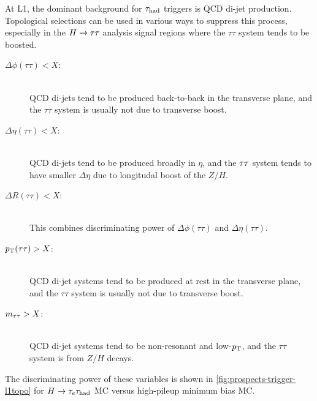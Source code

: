 At L1, the dominant background for $\tau_\text{had}$ triggers is QCD di-jet production. Topological selections can be used in various ways to suppress this process, especially in the $H\rightarrow\tau\tau$ analysis signal regions where the $\tau\tau$ system tends to be boosted.
%
\begin{description}
    \item[$\Delta\phi(\tau\tau) < X$:] \hfill \\
      QCD di-jets tend to be produced back-to-back in the transverse plane, and the $\tau\tau$ system is usually not due to transverse boost.
    \item[$\Delta\eta(\tau\tau) < X$:] \hfill \\
      QCD di-jets tend to be produced broadly in $\eta$, and the $\tau\tau$ system tends to have smaller $\Delta\eta$ due to longitudal boost of the $Z/H$.
    \item[$\Delta R(\tau\tau) < X$:] \hfill \\
      This combines discriminating power of $\Delta\phi(\tau\tau)$ and $\Delta\eta(\tau\tau)$.
    \item[$p_{\mathrm{T}}(\tau\tau) > X$:] \hfill \\
      QCD di-jet systems tend to be produced at rest in the transverse plane, and the $\tau\tau$ system is usually not due to transverse boost.
    \item[$m_{\tau\tau} > X$:] \hfill \\
      QCD di-jet systems tend to be non-resonant and low-$p_{\mathrm{T}}$, and the $\tau\tau$ system is from $Z/H$ decays.
\end{description}
%
The discriminating power of these variables is shown in \cref{fig:prospects-trigger-l1topo} for $H\rightarrow\tau_e \tau_\text{had}$ MC versus high-pileup minimum bias MC. 

